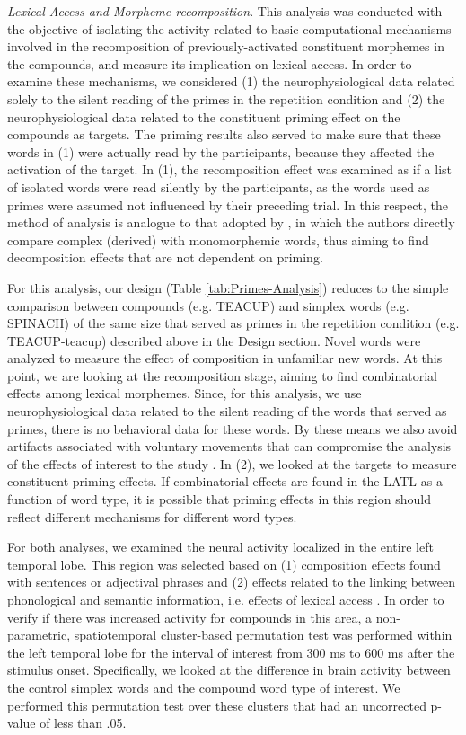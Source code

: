 \documentclass{frontiersSCNS}
\begin{document}
\textit{Lexical Access and Morpheme recomposition}.  This analysis was conducted with the objective of isolating the activity related to basic computational mechanisms involved in the recomposition of previously-activated constituent morphemes in the compounds, and measure its implication on lexical access. In order to examine these mechanisms, we considered (1)  the neurophysiological data related solely to the silent reading of the primes in the repetition condition and (2) the neurophysiological data related to the constituent priming effect on the compounds as targets. The priming results also served to make sure that these words in (1) were actually read by the participants, because they affected the activation of the target.  In (1), the recomposition effect was examined as if a list of isolated words were read silently by the participants, as the words used as primes were assumed not influenced by their preceding trial. In this respect, the method of analysis is analogue to that adopted by \citet{Zweig:2009}, in which the authors directly compare complex (derived) with monomorphemic words, thus aiming to find decomposition effects that are not dependent on priming.  

For this analysis, our design (Table \ref{tab:Primes-Analysis}) reduces to the simple comparison between compounds (e.g. TEACUP) and simplex words (e.g. SPINACH) of the same size that served as primes in the repetition condition (e.g. TEACUP-teacup) described above in the Design section. Novel words were analyzed to measure the effect of composition in unfamiliar new words. At this point, we are looking at the recomposition stage, aiming to find combinatorial effects among lexical morphemes.   Since, for this analysis, we use neurophysiological data related to the silent reading of the words that served as primes, there is no behavioral data for these words.  By these means we also avoid artifacts associated with voluntary movements that can compromise the analysis of the effects of interest to the study \citep*{Hansen:2010}. In (2), we looked at the targets to measure constituent priming effects.  If combinatorial effects are found in the LATL as a function of word type, it is possible that priming effects in this region should reflect different mechanisms for different word types.
 
For both analyses, we examined the neural activity localized in the entire left temporal lobe. This region was selected based on (1) composition effects found with sentences \citep{Friederici:2000} or adjectival phrases \citep{Bemis:2011} and (2) effects related to the linking between phonological and semantic information, i.e. effects of lexical access \citep{Hickok:2007, Lau:2008}.
In order to verify if there was increased activity for compounds in this area, a non-parametric, spatiotemporal cluster-based permutation test was performed within the left temporal lobe for the interval of interest from 300 ms to 600 ms after the stimulus onset.  Specifically, we looked at the difference in brain activity between the control simplex words and the compound word type of interest. We performed this permutation test over these clusters that had an uncorrected p-value of less than .05.
\end{document}
